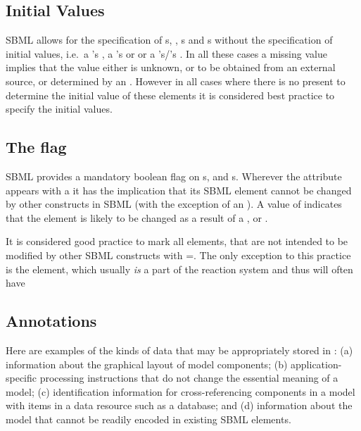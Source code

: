 \subsection{Initial Values}
\label{sec:bp:initialvalues}
SBML allows for the specification of \Compartment{}s, \Species, 
\Parameter{}s and \LocalParameter{}s without the specification of 
initial values, i.e.\ a \Compartment{}'s , a \Species{}'s 
 or  or a 
\Parameter{}'s/\LocalParameter{}'s . In all these cases 
a missing value implies that the value either is unknown, or to be 
obtained from an external source, or determined by an \InitialAssignment. 
However in all cases where 
there is no \InitialAssignment present to determine the initial value
of these elements it is considered best practice to specify the 
initial values.

\subsection{The  flag}
\label{sec:bp:constant}
SBML provides a mandatory boolean flag  on \Compartment{}s, 
\Species and \Parameter{}s. Wherever the  attribute appears with a 
it has the implication that its SBML element cannot be changed by other constructs 
in SBML (with the exception of an \InitialAssignment ). A value of  indicates
that the element is likely to be changed as a result of a \Rule, \Reaction or \Event. 

It is considered good practice to mark all elements, that are not intended to be 
modified by other SBML constructs with =. The only exception
to this practice is the \Species element, which usually \emph{is} a part of the reaction 
system and thus will often have 

\subsection{Annotations}
\label{sec:bp:annotations}

Here are examples of the kinds of data that may be appropriately
stored in : (a) information about the graphical
layout of model components; (b) application-specific processing
instructions that do not change the essential meaning of a model;
(c) identification information for cross-referencing components in
a model with items in a data resource such as a database;
  and (d) information about the model that cannot be
  readily encoded in existing SBML elements.



